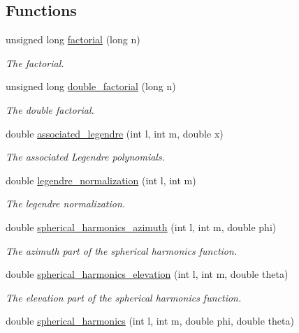 \subsection*{Functions}
\begin{DoxyCompactItemize}
\item 
unsigned long \hyperlink{namespace_hoa3_d_a96c1f78af4f18be9ccf629c60c9e5093}{factorial} (long n)
\begin{DoxyCompactList}\small\item\em The factorial. \end{DoxyCompactList}\item 
unsigned long \hyperlink{namespace_hoa3_d_a9fe0188eb2c8ec6bb9de34054449b497}{double\-\_\-factorial} (long n)
\begin{DoxyCompactList}\small\item\em The double factorial. \end{DoxyCompactList}\item 
double \hyperlink{namespace_hoa3_d_af20cfa7da792b7bb0b6f98eccb371ca8}{associated\-\_\-legendre} (int l, int m, double x)
\begin{DoxyCompactList}\small\item\em The associated Legendre polynomials. \end{DoxyCompactList}\item 
double \hyperlink{namespace_hoa3_d_a771a662a201e9922fd8084dafb507a20}{legendre\-\_\-normalization} (int l, int m)
\begin{DoxyCompactList}\small\item\em The legendre normalization. \end{DoxyCompactList}\item 
double \hyperlink{namespace_hoa3_d_a03f884a043a03a2a70cd3cdf46eaa7a5}{spherical\-\_\-harmonics\-\_\-azimuth} (int l, int m, double phi)
\begin{DoxyCompactList}\small\item\em The azimuth part of the spherical harmonics function. \end{DoxyCompactList}\item 
double \hyperlink{namespace_hoa3_d_a36da69477764cc43e96106d7436d0797}{spherical\-\_\-harmonics\-\_\-elevation} (int l, int m, double theta)
\begin{DoxyCompactList}\small\item\em The elevation part of the spherical harmonics function. \end{DoxyCompactList}\item 
double \hyperlink{namespace_hoa3_d_a5c89b100a0887912882451b15d3c69b9}{spherical\-\_\-harmonics} (int l, int m, double phi, double theta)

\end{DoxyCompactItemize}
